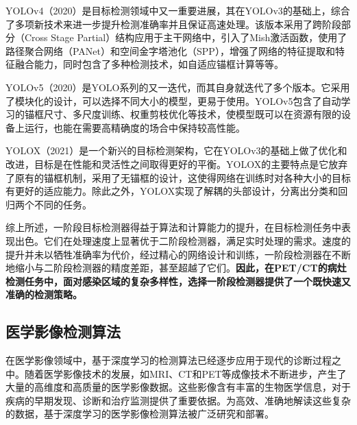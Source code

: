 YOLOv4\cite{bochkovskiy2020yolov4}（2020）是目标检测领域中又一重要进展，其在YOLOv3\cite{redmon2018yolov3}的基础上，综合了多项新技术来进一步提升检测准确率并且保证高速处理。该版本采用了跨阶段部分（Cross Stage Partial）\cite{wang2020cspnet}结构应用于主干网络中，引入了Mish\cite{misra2019mish}激活函数，使用了路径聚合网络（PANet）\cite{liu2018path}和空间金字塔池化（SPP）\cite{he2015spatial}，增强了网络的特征提取和特征融合能力，同时包含了多种检测技术，如自适应锚框计算等等。

YOLOv5\cite{jocher2020yolov5}（2020）是YOLO系列的又一迭代，而其自身就迭代了多个版本。它采用了模块化的设计，可以选择不同大小的模型，更易于使用。YOLOv5包含了自动学习的锚框尺寸、多尺度训练、权重剪枝优化等技术，使模型既可以在资源有限的设备上运行，也能在需要高精确度的场合中保持较高性能。

YOLOX\cite{ge2021yolox}（2021）是一个新兴的目标检测架构，它在YOLOv3的基础上做了优化和改进，目标是在性能和灵活性之间取得更好的平衡。YOLOX的主要特点是它放弃了原有的锚框机制，采用了无锚框的设计，这使得网络在训练时对各种大小的目标有更好的适应能力。除此之外，YOLOX实现了解耦的头部设计，分离出分类和回归两个不同的任务。

综上所述，一阶段目标检测器得益于算法和计算能力的提升，在目标检测任务中表现出色。它们在处理速度上显著优于二阶段检测器，满足实时处理的需求。速度的提升并未以牺牲准确率为代价，经过精心的网络设计和训练，一阶段检测器在不断地缩小与二阶段检测器的精度差距，甚至超越了它们。\textbf{因此，在PET/CT的病灶检测任务中，面对感染区域的复杂多样性，选择一阶段检测器提供了一个既快速又准确的检测策略。}

\subsection{医学影像检测算法}

在医学影像领域中，基于深度学习的检测算法已经逐步应用于现代的诊断过程之中。随着医学影像技术的发展，如MRI、CT和PET等成像技术不断进步，产生了大量的高维度和高质量的医学影像数据。这些影像含有丰富的生物医学信息，对于疾病的早期发现、诊断和治疗监测提供了重要依据。为高效、准确地解读这些复杂的数据，基于深度学习的医学影像检测算法被广泛研究和部署。

